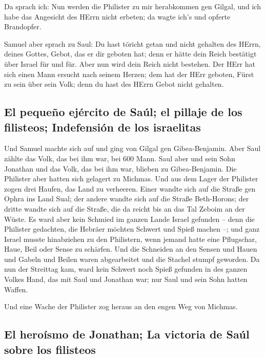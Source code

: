  Da sprach ich: Nun werden die Philister zu mir
herabkommen gen Gilgal, und ich habe das Angesicht des HErrn nicht
erbeten; da wagte ich's und opferte Brandopfer.

 Samuel aber sprach zu Saul: Du hast töricht getan und
nicht gehalten des HErrn, deines Gottes, Gebot, das er dir geboten hat;
denn er hätte dein Reich bestätigt über Israel für und für.
 Aber nun wird dein Reich nicht bestehen. Der HErr hat
sich einen Mann ersucht nach seinem Herzen; dem hat der HErr geboten,
Fürst zu sein über sein Volk; denn du hast des HErrn Gebot nicht
gehalten.

\hypertarget{el-pequeuxf1o-ejuxe9rcito-de-sauxfal-el-pillaje-de-los-filisteos-indefensiuxf3n-de-los-israelitas}{%
\subsection{El pequeño ejército de Saúl; el pillaje de los filisteos;
Indefensión de los
israelitas}\label{el-pequeuxf1o-ejuxe9rcito-de-sauxfal-el-pillaje-de-los-filisteos-indefensiuxf3n-de-los-israelitas}}

 Und Samuel machte sich auf und ging von Gilgal gen
Gibea-Benjamin. Aber Saul zählte das Volk, das bei ihm war, bei 600
Mann.  Saul aber und sein Sohn Jonathan und das Volk, das
bei ihm war, blieben zu Gibea-Benjamin. Die Philister aber hatten sich
gelagert zu Michmas.  Und aus dem Lager der Philister
zogen drei Haufen, das Land zu verheeren. Einer wandte sich auf die
Straße gen Ophra ins Land Sual;  der andere wandte sich
auf die Straße Beth-Horons; der dritte wandte sich auf die Straße, die
da reicht bis an das Tal Zeboim an der Wüste.  Es ward
aber kein Schmied im ganzen Lande Israel gefunden -- denn die Philister
gedachten, die Hebräer möchten Schwert und Spieß machen --;
 und ganz Israel musste hinabziehen zu den Philistern,
wenn jemand hatte eine Pflugschar, Haue, Beil oder Sense zu schärfen.
 Und die Schneiden an den Sensen und Hauen und Gabeln und
Beilen waren abgearbeitet und die Stachel stumpf geworden.
 Da nun der Streittag kam, ward kein Schwert noch Spieß
gefunden in des ganzen Volkes Hand, das mit Saul und Jonathan war; nur
Saul und sein Sohn hatten Waffen.

 Und eine Wache der Philister zog heraus an den engen Weg
von Michmas.

\hypertarget{el-herouxedsmo-de-jonathan-la-victoria-de-sauxfal-sobre-los-filisteos}{%
\subsection{El heroísmo de Jonathan; La victoria de Saúl sobre los
filisteos}\label{el-herouxedsmo-de-jonathan-la-victoria-de-sauxfal-sobre-los-filisteos}}

